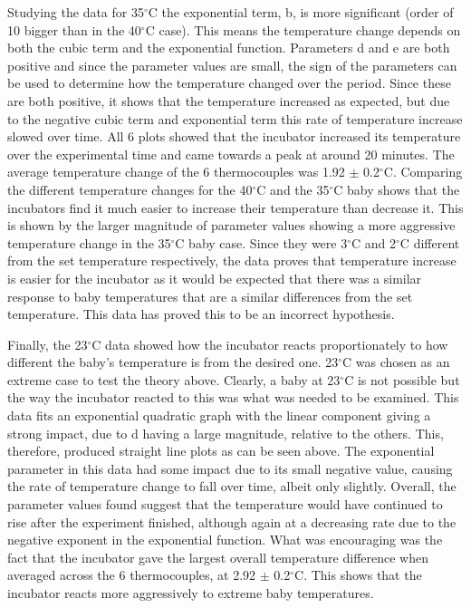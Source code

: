 \documentclass{article}
\begin{document}
 \vspace{3mm}
 
Studying the data for 35$^{\circ}$C the exponential term, b, is more significant (order of 10 bigger than in the 40$^{\circ}$C case). This means the temperature change depends on both the cubic term and the exponential function. Parameters d and e are both positive and since the parameter values are small, the sign of the parameters can be used to determine how the temperature changed over the period. Since these are both positive, it shows that the temperature increased as expected, but due to the negative cubic term and exponential term this rate of temperature increase slowed over time. All 6 plots showed that the incubator increased its temperature over the experimental time and came towards a peak at around 20 minutes. The average temperature change of the 6 thermocouples was 1.92 $\pm$ 0.2$^{\circ}$C. Comparing the different temperature changes for the 40$^{\circ}$C and the 35$^{\circ}$C baby shows that the incubators find it much easier to increase their temperature than decrease it. This is shown by the larger magnitude of parameter values showing a more aggressive temperature change in the 35$^{\circ}$C baby case. Since they were 3$^{\circ}$C and 2$^{\circ}$C different from the set temperature respectively, the data proves that temperature increase is easier for the incubator as it would be expected that there was a similar response to baby temperatures that are a similar differences from the set temperature. This data has proved this to be an incorrect hypothesis. 

\vspace{3mm}

Finally, the 23$^{\circ}$C data showed how the incubator reacts proportionately to how different the baby’s temperature is from the desired one. 23$^{\circ}$C was chosen as an extreme case to test the theory above. Clearly, a baby at 23$^{\circ}$C is not possible but the way the incubator reacted to this was what was needed to be examined. This data fits an exponential quadratic graph with the linear component giving a strong impact, due to d having a large magnitude, relative to the others. This, therefore, produced straight line plots as can be seen above. The exponential parameter in this data had some impact due to its small negative value, causing the rate of temperature change to fall over time, albeit only slightly. Overall, the parameter values found suggest that the temperature would have continued to rise after the experiment finished, although again at a decreasing rate due to the negative exponent in the exponential function. What was encouraging was the fact that the incubator gave the largest overall temperature difference when averaged across the 6 thermocouples, at 2.92 $\pm$ 0.2$^{\circ}$C. This shows that the incubator reacts more aggressively to extreme baby temperatures. 
\end{document}
